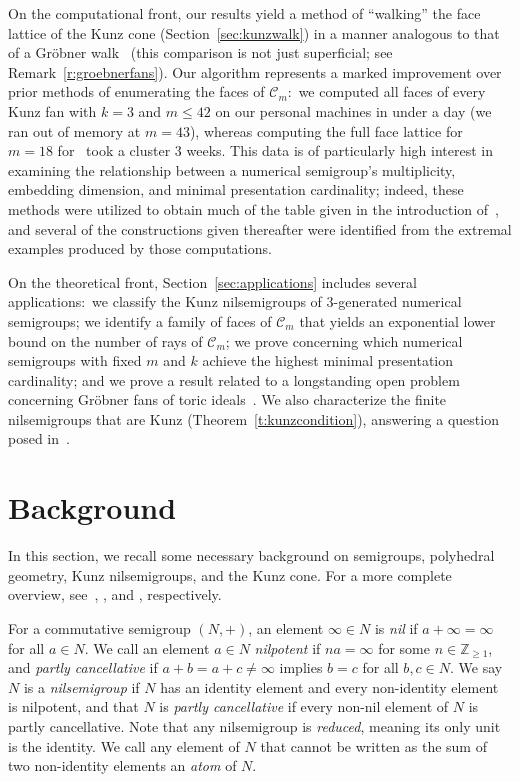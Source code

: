 \documentclass[ALCO, Unicode]{cedram}
\newcommand\ZZ{\mathbb{Z}}
\newcommand\cC{{\mathcal C}}
\begin{document}
On the computational front, our results yield a method of ``walking'' the face lattice of the Kunz cone (Section~\ref{sec:kunzwalk}) in a manner analogous to that of a Gr\"obner walk~\cite{toricgroebnerwalk} (this comparison is not just superficial; see Remark~\ref{r:groebnerfans}).  Our algorithm represents a marked improvement over prior methods of enumerating the faces of $\cC_m$:\ we computed all faces of every Kunz fan with $k = 3$ and $m \le 42$ on our personal machines in under a day (we ran out of memory at $m = 43$), whereas computing the full face lattice for $m = 18$ for~\cite{wilfmultiplicity} took a cluster 3 weeks.  This data is of particularly high interest in examining the relationship between a numerical semigroup's multiplicity, embedding dimension, and minimal presentation cardinality; indeed, these methods were utilized to obtain much of the table given in the introduction of~\cite{minprescard}, and several of the constructions given thereafter were identified from the extremal examples produced by those computations.  

On the theoretical front, Section~\ref{sec:applications} includes several applications:\ 
we classify the Kunz nilsemigroups of 3-generated numerical semigroups; 
we identify a family of faces of $\cC_m$ that yields an exponential lower bound on the number of rays of $\cC_m$; 
we prove \cite[Conjecture~7.3]{minprescard} concerning which numerical semigroups with fixed $m$ and $k$ achieve the highest minimal presentation cardinality; 
and we prove a result related to a longstanding open problem concerning Gr\"obner fans of toric ideals~\cite{groenberfanchamberfacets}.  We also characterize the finite nilsemigroups that are Kunz (Theorem~\ref{t:kunzcondition}), answering a question posed in~\cite{kunzfaces1}.  


\section{Background}
\label{sec:background}

In this section, we recall some necessary background on semigroups, polyhedral geometry, Kunz nilsemigroups, and the Kunz cone. For a more complete overview, see~\cite{numericalappl}, \cite{ziegler}, \cite[Section~2]{minprescard} and \cite[Section~3]{kunzfaces3}, respectively.  

For a commutative semigroup $(N, +)$, an element $\infty\in N$ is \emph{nil} if $a + \infty = \infty$ for all $a \in N$. We call an element $a \in N$ \emph{nilpotent} if $na = \infty$ for some $n \in \ZZ_{\geq 1}$, and \emph{partly cancellative} if $a + b = a + c \ne \infty$ implies $b = c$ for all $b,c \in N$. We say $N$ is a \emph{nilsemigroup} if $N$ has an identity element and every non-identity element is nilpotent, and that $N$ is \emph{partly cancellative} if every non-nil element of $N$ is partly cancellative.  Note that any nilsemigroup is \emph{reduced}, meaning its only unit is the identity.  We call any element of $N$ that cannot be written as the sum of two non-identity elements an \emph{atom} of $N$. 
\end{document}
